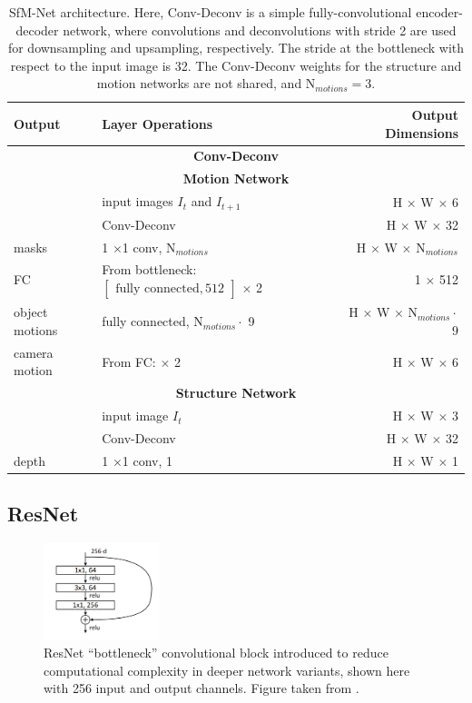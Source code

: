 {
\begin{table}[h]
\centering
\begin{tabular}{llr}
\toprule
\textbf{Output} & \textbf{Layer Operations} & \textbf{Output Dimensions} \\
\midrule\midrule
\multicolumn{3}{c}{\textbf{Conv-Deconv}}\\
\midrule
\multicolumn{3}{c}{\textbf{Motion Network}}\\
\midrule
 & input images $I_t$ and $I_{t+1}$ & H $\times$ W $\times$ 6 \\
 & Conv-Deconv & H $\times$ W $\times$ 32 \\
masks & 1 $\times$1 conv, N$_{motions}$ & H $\times$ W $\times$ N$_{motions}$ \\
FC & From bottleneck: $\begin{bmatrix}\textrm{fully connected}, 512\end{bmatrix}$ $\times$ 2 & 1 $\times$ 512 \\
object motions & fully connected, $\text{N}_{motions} \cdot$ 9 & H $\times$ W $\times$ $\text{N}_{motions} \cdot$ 9 \\
camera motion & From FC: $\times$ 2 & H $\times$ W $\times$ 6 \\
\midrule
\multicolumn{3}{c}{\textbf{Structure Network}}\\
\midrule
& input image $I_t$ & H $\times$ W $\times$ 3 \\
& Conv-Deconv & H $\times$ W $\times$ 32 \\
depth & 1 $\times$1 conv, 1  & H $\times$ W $\times$ 1 \\
\bottomrule


\end{tabular}

\caption {
SfM-Net \cite{SfmNet} architecture. Here, Conv-Deconv is a simple fully-convolutional
encoder-decoder network, where convolutions and deconvolutions with stride 2 are
used for downsampling and upsampling, respectively. The stride at the bottleneck
with respect to the input image is 32.
The Conv-Deconv weights for the structure and motion networks are not shared,
and N$_{motions} = 3$.
}
\label{table:sfmnet}
\end{table}
}

\subsection{ResNet}
\label{ssec:resnet}

\begin{figure}[t]
  \centering
  \includegraphics[width=0.3\textwidth]{figures/bottleneck}
\caption{
ResNet \cite{ResNet} \enquote{bottleneck} convolutional block introduced to reduce computational
complexity in deeper network variants, shown here with 256 input and output channels.
Figure taken from \cite{ResNet}.
}
\label{figure:bottleneck}
\end{figure}

